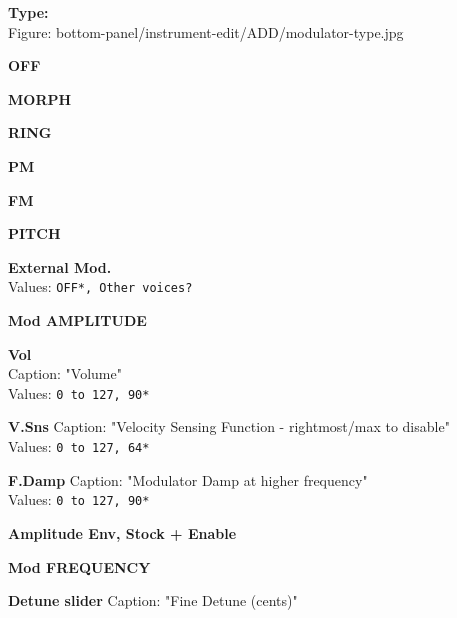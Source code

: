 \documentclass[
 11pt,
 twoside,
 a4paper,
 headinclude,
 footinclude,
 final                                 %
]{article}
\begin{document}
\begin{enumber}
\begin{enumber}
\begin{enumber}
\begin{enumber}
\begin{enumber}
                  \item \textbf{Type:} \\
                     Figure: bottom-panel/instrument-edit/ADD/modulator-type.jpg \\
                     \begin{enumber}
                        \item \textbf{OFF}
                        \item \textbf{MORPH}
                        \item \textbf{RING}
                        \item \textbf{PM}
                        \item \textbf{FM}
                        \item \textbf{PITCH}
                     \end{enumber}
                  \item \textbf{External Mod.} \\
                     Values: \texttt{OFF*, Other voices?}
                  \item \textbf{Mod AMPLITUDE}
                     \begin{enumber}
                        \item \textbf{Vol} \\
                           Caption: "Volume" \\
                           Values: \texttt{0 to 127, 90*}
                        \item \textbf{V.Sns}
                           Caption: "Velocity Sensing Function -
                              rightmost/max to disable" \\
                           Values: \texttt{0 to 127, 64*}
                        \item \textbf{F.Damp}
                           Caption: "Modulator Damp at higher frequency" \\
                           Values: \texttt{0 to 127, 90*}
                        \item \textbf{Amplitude Env, Stock + Enable}
                     \end{enumber}
                  \item \textbf{Mod FREQUENCY}
                     \begin{enumber}
                        \item \textbf{Detune slider}
                           Caption: "Fine Detune (cents)" \\

\end{enumber}
\end{enumber}
\end{enumber}
\end{enumber}
\end{enumber}
\end{enumber}
\end{document}
